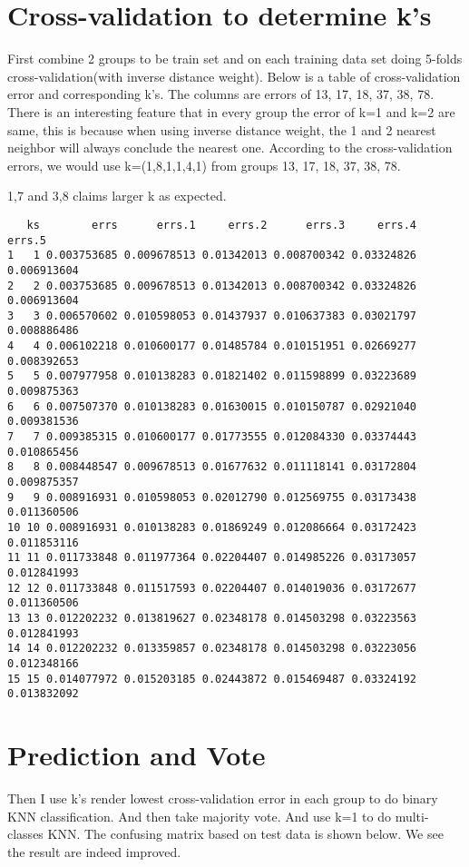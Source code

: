 \documentclass[12pt,a4paper]{article}
\begin{document}
\section{Cross-validation to determine k's}
First combine 2 groups to be train set and on each training data set doing 5-folds cross-validation(with inverse distance weight). Below is a table of cross-validation error and corresponding k's. The columns are errors of 13, 17, 18, 37, 38, 78. There is an interesting feature that in every group the error of k=1 and k=2 are same, this is because when using inverse distance weight, the 1 and 2 nearest neighbor will always conclude the nearest one. According to the cross-validation errors, we would use k=(1,8,1,1,4,1) from groups 13, 17, 18, 37, 38, 78. 

1,7 and 3,8 claims larger k as expected.
\begin{verbatim}
   ks        errs      errs.1     errs.2      errs.3     errs.4      errs.5
1   1 0.003753685 0.009678513 0.01342013 0.008700342 0.03324826 0.006913604
2   2 0.003753685 0.009678513 0.01342013 0.008700342 0.03324826 0.006913604
3   3 0.006570602 0.010598053 0.01437937 0.010637383 0.03021797 0.008886486
4   4 0.006102218 0.010600177 0.01485784 0.010151951 0.02669277 0.008392653
5   5 0.007977958 0.010138283 0.01821402 0.011598899 0.03223689 0.009875363
6   6 0.007507370 0.010138283 0.01630015 0.010150787 0.02921040 0.009381536
7   7 0.009385315 0.010600177 0.01773555 0.012084330 0.03374443 0.010865456
8   8 0.008448547 0.009678513 0.01677632 0.011118141 0.03172804 0.009875357
9   9 0.008916931 0.010598053 0.02012790 0.012569755 0.03173438 0.011360506
10 10 0.008916931 0.010138283 0.01869249 0.012086664 0.03172423 0.011853116
11 11 0.011733848 0.011977364 0.02204407 0.014985226 0.03173057 0.012841993
12 12 0.011733848 0.011517593 0.02204407 0.014019036 0.03172677 0.011360506
13 13 0.012202232 0.013819627 0.02348178 0.014503298 0.03223563 0.012841993
14 14 0.012202232 0.013359857 0.02348178 0.014503298 0.03223056 0.012348166
15 15 0.014077972 0.015203185 0.02443872 0.015469487 0.03324192 0.013832092
\end{verbatim}
\section{Prediction and Vote}
Then I use k's render lowest cross-validation error in each group to do binary KNN classification. And then take majority vote.
And use k=1 to do multi-classes KNN. The confusing matrix based on test data is shown below. We see the result are indeed improved.
\end{document}
